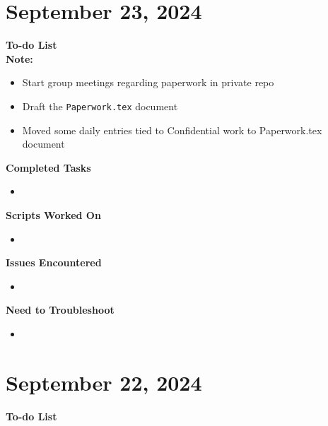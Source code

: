 \documentclass[11pt]{report}
\newcommand{\done}{\checkmark}
\begin{document}
{\section{September 23, 2024}


\textbf{To-do List} \\
\textbf{Note:} 

\begin{itemize}
	\item [\done] Start group meetings regarding paperwork in private repo
	\item [\done] Draft the \texttt{Paperwork.tex} document
	\item [\done] Moved some daily entries tied to Confidential work to Paperwork.tex document

		
\end{itemize}

\textbf{Completed Tasks}
\begin{itemize}
	\item 
\end{itemize}

\textbf{Scripts Worked On}
\begin{itemize}
	\item 
\end{itemize}


\textbf{Issues Encountered}
\begin{itemize}
	\item 
\end{itemize}

\textbf{Need to Troubleshoot}
\begin{itemize}
	\item 
\end{itemize}
\newpage
\section{September 22, 2024}
\textbf{To-do List} \\


}
\end{document}
